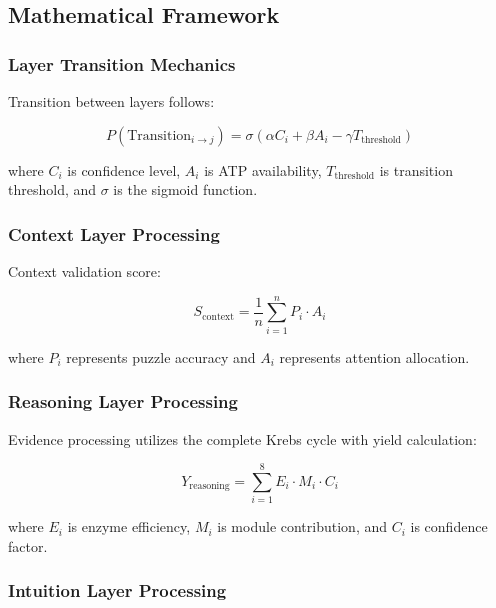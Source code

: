 \documentclass[12pt,a4paper]{article}
\begin{document}
\subsection{Mathematical Framework}

\subsubsection{Layer Transition Mechanics}

Transition between layers follows:

\begin{equation}
P(\text{Transition}_{i \rightarrow j}) = \sigma\left(\alpha C_i + \beta A_i - \gamma T_{\text{threshold}}\right)
\end{equation}

where $C_i$ is confidence level, $A_i$ is ATP availability, $T_{\text{threshold}}$ is transition threshold, and $\sigma$ is the sigmoid function.

\subsubsection{Context Layer Processing}

Context validation score:

\begin{equation}
S_{\text{context}} = \frac{1}{n}\sum_{i=1}^{n} P_i \cdot A_i
\end{equation}

where $P_i$ represents puzzle accuracy and $A_i$ represents attention allocation.

\subsubsection{Reasoning Layer Processing}

Evidence processing utilizes the complete Krebs cycle with yield calculation:

\begin{equation}
Y_{\text{reasoning}} = \sum_{i=1}^{8} E_i \cdot M_i \cdot C_i
\end{equation}

where $E_i$ is enzyme efficiency, $M_i$ is module contribution, and $C_i$ is confidence factor.

\subsubsection{Intuition Layer Processing}
\end{document}
